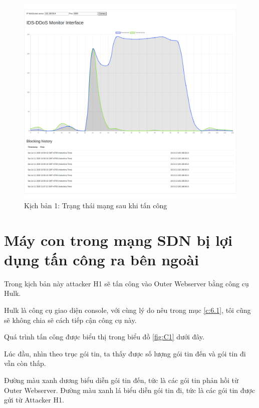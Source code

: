 \begin{figure}[ht!]
	\centering
	\includegraphics[width=\linewidth]{fig/B2.png}
	\caption{Kịch bản 1: Trạng thái mạng sau khi tấn công}
	\label{fig:B2}
\end{figure}

\section{Máy con trong mạng SDN bị lợi dụng tấn công ra bên ngoài}

Trong kịch bản này attacker H1 sẽ tấn công vào Outer Webserver bằng công cụ Hulk.

Hulk là công cụ giao diện console, với cùng lý do nêu trong mục \ref{c:6.1}, tôi cũng sẽ không chia sẽ cách tiếp cận công cụ này.

Quá trình tấn công được biểu thị trong biểu đồ \ref{fig:C1} dưới đây.

Lúc đầu, nhìn theo trục gói tin, ta thấy được số lượng gói tin đến và gói tin đi vẫn còn thấp.

Đường màu xanh dương biểu diễn gói tin đến, tức là các gói tin phản hồi từ Outer Webserver. Đường màu xanh lá biểu diễn gói tin đi, tức là các gói tin được gửi từ Attacker H1.

